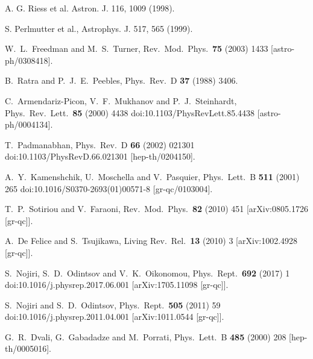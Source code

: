\begin{thebibliography}{00}

 A. G. Riess et al. Astron. J. 116, 1009 (1998).

 S. Perlmutter et al., Astrophys. J. 517, 565 (1999).

 W.~L.~Freedman and M.~S.~Turner,
  Rev.\ Mod.\ Phys.\  {\bf 75} (2003) 1433
[astro-ph/0308418].

 B.~Ratra and P.~J.~E.~Peebles,
  Phys.\ Rev.\ D {\bf 37} (1988) 3406.
  
 C.~Armendariz-Picon, V.~F.~Mukhanov and P.~J.~Steinhardt,
  Phys.\ Rev.\ Lett.\  {\bf 85} (2000) 4438
  doi:10.1103/PhysRevLett.85.4438
  [astro-ph/0004134].
  
 T.~Padmanabhan,
  Phys.\ Rev.\ D {\bf 66} (2002) 021301
  doi:10.1103/PhysRevD.66.021301
  [hep-th/0204150].

 A.~Y.~Kamenshchik, U.~Moschella and V.~Pasquier,
  Phys.\ Lett.\ B {\bf 511} (2001) 265
  doi:10.1016/S0370-2693(01)00571-8
  [gr-qc/0103004].

 T.~P.~Sotiriou and V.~Faraoni,
  Rev.\ Mod.\ Phys.\  {\bf 82} (2010) 451
[arXiv:0805.1726 [gr-qc]].

 A.~De Felice and S.~Tsujikawa,
Living Rev.\ Rel.\  {\bf 13} (2010) 3
[arXiv:1002.4928 [gr-qc]].


  S.~Nojiri, S.~D.~Odintsov and V.~K.~Oikonomou,
  Phys.\ Rept.\  {\bf 692} (2017) 1
  doi:10.1016/j.physrep.2017.06.001
  [arXiv:1705.11098 [gr-qc]].
  
  S.~Nojiri and S.~D.~Odintsov,
  Phys.\ Rept.\  {\bf 505} (2011) 59
  doi:10.1016/j.physrep.2011.04.001
  [arXiv:1011.0544 [gr-qc]].  
    

 G.~R.~Dvali, G.~Gabadadze and M.~Porrati,
  Phys.\ Lett.\ B {\bf 485} (2000) 208
[hep-th/0005016].


\end{thebibliography}
